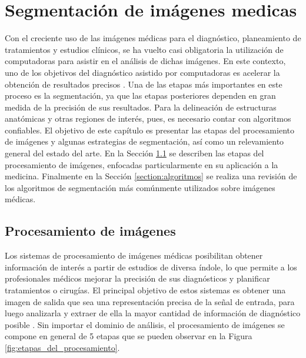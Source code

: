 \chapter{Segmentación de imágenes medicas}\label{chapter:segmencation}
Con el creciente uso de las imágenes médicas para el diagnóstico, planeamiento de tratamientos y estudios clínicos, se ha vuelto casi obligatoria la utilización de computadoras para asistir en el análisis de dichas imágenes. En este contexto, uno de los objetivos del diagnóstico asistido por computadoras es acelerar la obtención de resultados precisos \citep{Sharma2010}. Una de las etapas más importantes en este proceso es la segmentación, ya que las etapas posteriores dependen en gran medida de la precisión de sus resultados. Para la delineación de estructuras anatómicas y otras regiones de interés, pues, es necesario contar con algoritmos confiables. 
El objetivo de este capítulo es presentar las etapas del procesamiento de imágenes y algunas estrategias de segmentación, así como un relevamiento general del estado del arte. En la Sección \ref{section:procesamiento} se describen las etapas del procesamiento de imágenes, enfocadas particularmente en su aplicación a la medicina. Finalmente en la Sección \ref{section:algoritmos} se realiza una revisión de los algoritmos de segmentación más comúnmente utilizados sobre imágenes médicas.

\section{Procesamiento de imágenes}\label{section:procesamiento}
Los sistemas de procesamiento de imágenes médicas posibilitan obtener información de interés a partir de estudios de diversa índole, lo que permite a los profesionales médicos mejorar la precisión de sus diagnósticos y planificar tratamientos o cirugías. El principal objetivo de estos sistemas es obtener una imagen de salida que sea una representación precisa de la señal de entrada, para luego analizarla y extraer de ella la mayor cantidad de información de diagnóstico posible \citep{dougherty2009digital}. Sin importar el dominio de análisis, el procesamiento de imágenes se compone en general de 5 etapas que se pueden observar en la Figura \ref{fig:etapas_del_procesamiento}.

